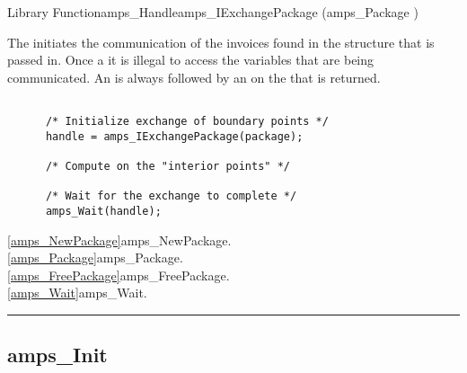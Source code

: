 \begin{deftypefn}{Library Function}{amps_Handle}{amps\_IExchangePackage}
(amps_Package )

\DESCRIPTION

The  initiates the communication of the
invoices found in the  structure that is passed in.  Once a
 it is illegal to access the
variables that are being communicated.  An 
is always followed by an  on the  that is
returned. 

\begin{display}\begin{verbatim}

      /* Initialize exchange of boundary points */
      handle = amps_IExchangePackage(package);
 
      /* Compute on the "interior points" */

      /* Wait for the exchange to complete */
      amps_Wait(handle);

\end{verbatim}\end{display}

\SEEALSO
\vref{amps_NewPackage}{amps\_NewPackage}. \\
\vref{amps_Package}{amps\_Package}. \\
\vref{amps_FreePackage}{amps\_FreePackage}. \\
\vref{amps_Wait}{amps\_Wait}. \\

\end{deftypefn}



\noindent\rule{\textwidth}{1mm}
\subsection{amps\_Init}
\label{amps_Init}


